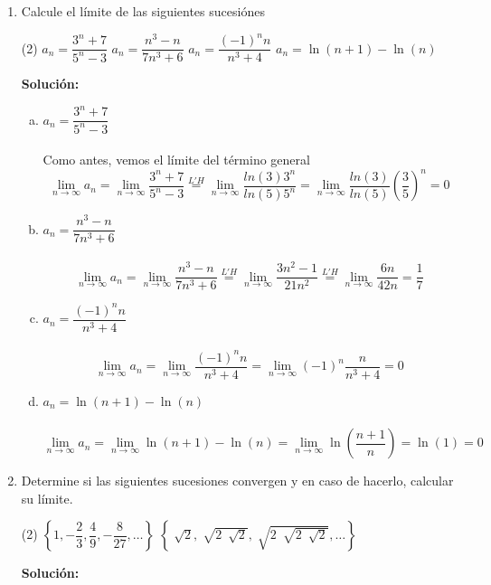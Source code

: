 \documentclass[12pt]{article}
\newenvironment{solucion}
{\begin{mdframed}[backgroundcolor=black!10]
		{\bf Solución:}\\
	}
	{
	\end{mdframed}
}
\newenvironment{preguntas}
{\begin{enumerate}\itemsep12pt
	}
	{
	\end{enumerate}
}
\newcommand{\ra}{\rightarrow}
\begin{document}
\begin{preguntas}
\item Calcule el límite de las siguientes sucesiónes
\begin{tasks}(2)
\task $a_n = \dfrac{3^n+7}{5^n-3}$
\task $a_n = \dfrac{n^3-n}{7n^3+6}$
\task $a_n = \dfrac{(-1)^n n}{n^3+4}$
\task $a_n=\ln(n+1)-\ln(n)$
\end{tasks}
\begin{solucion}

\begin{enumerate}[a)]
\item $a_n = \dfrac{3^n+7}{5^n-3}$\\
			\\
			Como antes, vemos el límite del término general
			$$\lim\limits_{n\ra \infty} a_n = \lim\limits_{n\ra \infty} \dfrac{3^n+7}{5^n-3} \stackrel{L'H}{=} \lim\limits_{n\ra \infty} \dfrac{ln(3)3^n}{ln(5)5^n} = \lim\limits_{n\ra \infty} \dfrac{ln(3)}{ln(5)} \left(\dfrac{3}{5}\right)^n = 0$$
\item $a_n = \dfrac{n^3-n}{7n^3+6}$\\
			\\
			$$\lim\limits_{n\ra \infty} a_n = \lim\limits_{n\ra \infty} \dfrac{n^3-n}{7n^3+6} \stackrel{L'H}{=} \lim\limits_{n\ra \infty} \dfrac{3n^2-1}{21n^2}
			\stackrel{L'H}{=} \lim\limits_{n\ra \infty} \dfrac{6n}{42n} = \dfrac{1}{7}$$
\item $a_n = \dfrac{(-1)^n n}{n^3+4}$\\
\\
$$\lim\limits_{n\ra \infty} a_n 
= \lim\limits_{n\ra \infty} \dfrac{(-1)^n n}{n^3+4}
= \lim\limits_{n\ra \infty} (-1)^n \dfrac{n}{n^3+4}
= 0$$
\item $a_n=\ln(n+1)-\ln(n)$\\
\\
$$\lim\limits_{n\ra \infty} a_n 
= \lim\limits_{n\ra \infty} \ln(n+1)-\ln(n)
= \lim\limits_{n\ra \infty} \ln\left({\dfrac{n+1}{n}}\right)
= \ln(1) = 0$$
\end{enumerate}
\end{solucion}
\item Determine si las siguientes sucesiones convergen y en caso de hacerlo, calcular su límite.
\begin{tasks}(2)
\task $\left\{1, -\dfrac{2}{3}, \dfrac{4}{9}, -\dfrac{8}{27}, \dots \right\}$
\task $\left\{\sqrt[]{2}, \sqrt[]{2\ \sqrt[]{2}}, \sqrt[]{2\ \sqrt[]{2\ \sqrt[]{2}}}, \dots \right\}$
\end{tasks}
\begin{solucion}


\end{solucion}
\end{preguntas}
\end{document}
